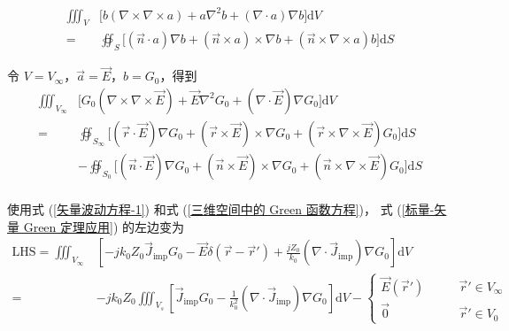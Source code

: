 \begin{equation}
    \begin{aligned}
        \iiint_V &\Big[
            b(\nabla\times\nabla\times a)
            +a\nabla^2 b
            +(\nabla \cdot a)\nabla b
        \Big]\text{d}V\\
        =
        &\oiint_S \Big[
            (\vec{n}\cdot a)\nabla b
            +(\vec{n}\times a)\times\nabla b
            +(\vec{n}\times\nabla\times a)b
        \Big]\text{d}S
    \end{aligned}
\end{equation}
\par 令 $V=V_{\infty}$，$\vec{a}=\vec{E}$，$b=G_0$，得到
\begin{equation}
    \label{标量-矢量 Green 定理应用}
    \begin{aligned}
        \iiint_{V_{\infty}} &\Big[
            G_0(\nabla\times\nabla\times \vec{E})
            +\vec{E}\nabla^2 G_0
            +(\nabla \cdot \vec{E})\nabla G_0
        \Big]\text{d}V\\
        =
        &\oiint_{S_{\infty}} \Big[
            (\vec{r}\cdot \vec{E})\nabla G_0
            +(\vec{r}\times \vec{E})\times\nabla G_0
            +(\vec{r}\times\nabla\times \vec{E})G_0
        \Big]\text{d}S\\
        &-
        \oiint_{S_0} \Big[
            (\vec{n}\cdot \vec{E})\nabla G_0
            +(\vec{n}\times \vec{E})\times\nabla G_0
            +(\vec{n}\times\nabla\times \vec{E})G_0
        \Big]\text{d}S\\
    \end{aligned}
\end{equation}
\par 使用式 (\ref{矢量波动方程-1}) 和式 (\ref{三维空间中的 Green 函数方程})，
式 (\ref{标量-矢量 Green 定理应用}) 的左边变为
\begin{equation}
    \begin{aligned}
        \text{LHS}
        =\iiint_{V_{\infty}} &\left[
            -jk_0Z_0 \vec{J}_{\text{imp}} G_0 
            -\vec{E}\delta(\vec{r}-\vec{r}')
            +\frac{jZ_0}{k_0}(\nabla \cdot \vec{J}_{\text{imp}})
            \nabla G_0
        \right]\text{d}V\\
        =
        &-jk_0Z_0\iiint_{V_{s}} \left[
            \vec{J}_{\text{imp}} G_0
            -\frac{1}{k_0^2}(\nabla \cdot \vec{J}_{\text{imp}})
            \nabla G_0
        \right]\text{d}V
        -
        \left\{
            \begin{aligned}
                \vec{E}(\vec{r}')  \qquad &\vec{r}' \in V_{\infty} \\
                \vec{0} \ \ \ \qquad &\vec{r}' \in V_{0}
            \end{aligned}
        \right.
    \end{aligned}
\end{equation}
